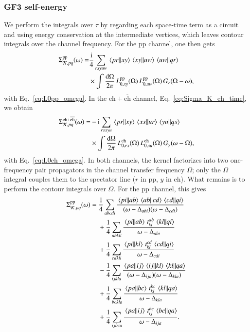 \documentclass[aip,jcp,reprint,noshowkeys,superscriptaddress]{revtex4-1}
\newcommand{\cK}{\mathcal{K}}
\newcommand{\ii}{\mathrm{i}}
\newcommand{\eh}{\text{eh}}
\newcommand{\teh}{\overline{\text{eh}}}
\newcommand{\pp}{\text{pp}}
\begin{document}
\subsubsection{GF3 self-energy}
We perform the integrals over $\tau$ by regarding each space-time term
as a circuit and using energy conservation at the intermediate vertices,
which leaves contour integrals over the channel frequency.
For the $\pp$ channel, one then gets
\begin{align}
\Sigma^{\pp}_{\cK,pq}(\omega)
= &
\frac{\ii}{4}
\sum_{rxyuw}
\mel{pr}{}{xy}\mel{xy}{}{uw}\mel{uw}{}{qr}
\nonumber\\
&\times
\int\frac{\dd\Omega}{2\pi}\,
L^{\pp}_{0,xy}(\Omega)\,L^{\pp}_{0,uw}(\Omega)\,
G_r(\Omega-\omega),
\label{eq:Sigma_K_pp_omega}
\end{align}
with Eq.~\eqref{eq:L0pp_omega}.
In the $\eh+\teh$ channel, Eq.~\eqref{eq:Sigma_K_eh_time}, we obtain 
\begin{align}
\Sigma^{\eh+\teh}_{\cK,pq}(\omega)
= &
-\ii
\sum_{rsxyu}
\mel{pr}{}{xy}\mel{xs}{}{ur}\mel{yu}{}{qs}
\nonumber\\
&\times
\int\frac{\dd\Omega}{2\pi}\,
L^{\eh}_{0,rx}(\Omega)\,L^{\eh}_{0,su}(\Omega)\,
G_y(\omega-\Omega),
\label{eq:Sigma_K_eh_omega}
\end{align}
with Eq.~\eqref{eq:L0eh_omega}.
In both channels, the kernel factorizes into two one-frequency
pair propagators in the channel transfer frequency $\Omega$; only the
$\Omega$ integral couples them to the spectator line
($r$ in $\pp$, $y$ in $\eh$).
What remains is to perform the contour integrals over $\Omega$. For
the $\pp$ channel, this gives 
\begin{align}
\Sigma^{\pp}_{\cK,pq}(\omega)
={}&
\frac14\sum_{abcdi}
\frac{\mel{pi}{}{ab}\mel{ab}{}{cd}\mel{cd}{}{qi}}
{(\omega-\Delta_{abi})(\omega-\Delta_{cdi})}
\label{eq:pp_in_plus}
\\
&+
\frac14\sum_{abkli}
\frac{\mel{pi}{}{ab}\,t_{kl}^{ab}\,\mel{kl}{}{qi}}
{\omega-\Delta_{abi}}
\label{eq:pp_lt_plus}
\\
&+
\frac14\sum_{cdkli}
\frac{\mel{pi}{}{kl}\,t_{kl}^{cd}\,\mel{cd}{}{qi}}
{\omega-\Delta_{cdi}}
\label{eq:pp_gt_plus}
\\
&-
\frac14\sum_{ijkla}
\frac{\mel{pa}{}{ij}\mel{ij}{}{kl}\mel{kl}{}{qa}}
{(\omega-\Delta_{ija})(\omega-\Delta_{kla})}
\label{eq:pp_in_minus}
\\
&+
\frac14\sum_{bckla}
\frac{\mel{pa}{}{bc}\,t_{kl}^{bc}\,\mel{kl}{}{qa}}
{\omega-\Delta_{kla}}
\label{eq:pp_lt_minus}
\\
&+
\frac14\sum_{ijbca}
\frac{\mel{pa}{}{ij}\,t_{ij}^{bc}\,\mel{bc}{}{qa}}
{\omega-\Delta_{ija}}.
\label{eq:pp_gt_minus}
\end{align}
\end{document}
